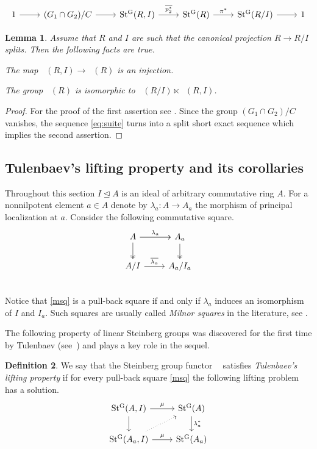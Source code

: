 \documentclass[oneside,12pt]{amsart}
\numberwithin{equation}{section}
\newtheorem{lem}{Lemma}
\numberwithin{lem}{section}
\theoremstyle{definition}
\newtheorem{dfn}[lem]{Definition}
\theoremstyle{remark}
\DeclareMathOperator{\St}{St^G}
\begin{document}
\begin{equation} \label{eq:suite} \begin{tikzcd} 1 \ar[r] & (G_1\cap G_2)/C \ar[r] & \St(R, I) \ar[r, "\overline{p_2^*}"] & \St(R) \ar[r, "\pi^*"] & \St(R/I) \ar[r] & 1 \end{tikzcd} \end{equation}

\begin{lem} 
 Assume that $R$ and $I$ are such that the canonical projection $ R \to R/I $ splits.
 Then the following facts are true.
 \begin{lemlist}
   \item \label{item:st-inj} The map $\St(R, I) \rightarrow \St(R)$ is an injection.
   \item \label{item:st-semi} The group $\St(R)$ is isomorphic to $\St(R/I) \ltimes \St(R, I)$.
 \end{lemlist}
\end{lem}
\begin{proof}
 For the proof of the first assertion see \cite[Lemma~8]{S15}.
 Since the group $(G_1 \cap G_2)/C$ vanishes, the sequence \eqref{eq:suite} turns into a split short exact sequence which implies the second assertion.
\end{proof}

\subsection{Tulenbaev's lifting property and its corollaries}
Throughout this section $I \trianglelefteq A$ is an ideal of arbitrary commutative ring $A$.
For a nonnilpotent element $a \in A$ denote by $\lambda_a\colon A \rightarrow A_a$ the morphism of principal localization at $a$.
Consider the following commutative square.
\begin{equation} \label{msq}
 \begin{tikzcd} 
    A \ar[r, "\lambda_a"] \ar[d, twoheadrightarrow] \ar[r] & A_a \ar[d, twoheadrightarrow] \\
    A/I \ar[r, "\overline{\lambda_a}"]& A_a/I_a\\
   \end{tikzcd}
\end{equation}
Notice that \eqref{msq} is a pull-back square if and only if $\lambda_a$ induces an isomorphism of $I$ and $I_a$.
Such squares are usually called \emph{Milnor squares} in the literature, see \cite[Ch.~I, \S~2]{Kbook}.

The following property of linear Steinberg groups was discovered for the first time by Tulenbaev 
(see~\cite[Lemmas 2.3, 3.2]{Tu}) and plays a key role in the sequel.
\begin{dfn} \label{def:tlp}
We say that the Steinberg group functor $\St$ satisfies {\it Tulenbaev's lifting property}
if for every pull-back square \eqref{msq} the following lifting problem has a solution.
\[\begin{tikzcd} \St(A,   I) \arrow[r, "\mu"] \arrow[d]          &  \St(A) \ar[d, "\lambda_a^*"] \\
                 \St(A_a, I) \arrow[r, "\mu"] \arrow[ur, dotted] &  \St(A_a) \end{tikzcd}\]
\end{dfn}
\end{document}
